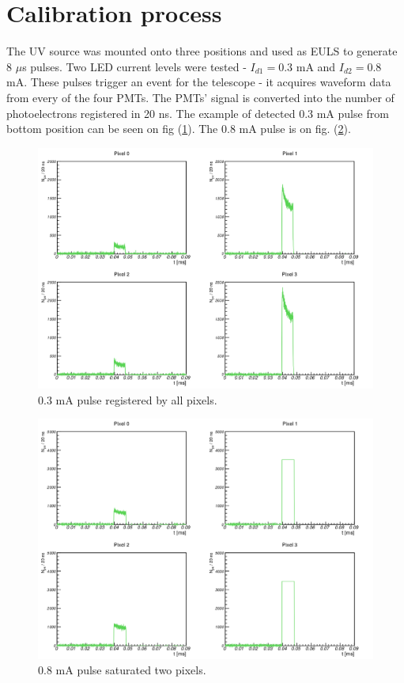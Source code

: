 \section{Calibration process}
The UV source was mounted onto three positions and used as EULS to generate $8$ $\mu$s pulses. Two LED current levels were tested - $I_{d1} = 0.3$ mA and $I_{d2} = 0.8$ mA. These pulses trigger an event for the telescope - it acquires waveform data from every of the four PMTs. The PMTs' signal is converted into the number of photoelectrons registered in 20 ns. The example of detected 0.3 mA pulse from bottom position can be seen on fig (\ref{03pulse}). The 0.8 mA pulse is on fig. (\ref{08pulse}).

\begin{figure}[H]
 \centering
 \includegraphics[scale=0.3, angle = 0]{./pictures/CalibPulses.png}
 \caption{0.3 mA pulse registered by all pixels.}
 \label{03pulse}
 
\end{figure}

\begin{figure}[H]
 \centering
 \includegraphics[scale=0.3, angle = 0]{./pictures/CalibSaturated.png}
 \caption{0.8 mA pulse saturated two pixels.}
 \label{08pulse}
 
\end{figure}


